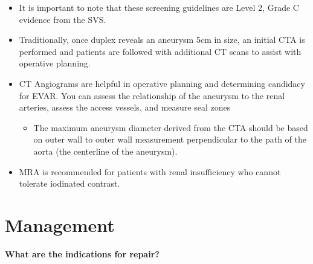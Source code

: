 \documentclass[
]{book}
\providecommand{\tightlist}{%
  \setlength{\itemsep}{0pt}\setlength{\parskip}{0pt}}
\begin{document}
\begin{itemize}
\item
  It is important to note that these screening guidelines are Level 2,
  Grade C evidence from the SVS.
\item
  Traditionally, once duplex reveals an aneurysm 5cm in size, an
  initial CTA is performed and patients are followed with additional
  CT scans to assist with operative planning.
\item
  CT Angiograms are helpful in operative planning and determining
  candidacy for EVAR. You can assess the relationship of the aneurysm
  to the renal arteries, assess the access vessels, and measure seal
  zones

  \begin{itemize}
  \tightlist
  \item
    The maximum aneurysm diameter derived from the CTA should be
    based on outer wall to outer wall measurement perpendicular to
    the path of the aorta (the centerline of the aneurysm).
  \end{itemize}
\item
  MRA is recommended for patients with renal insufficiency who cannot
  tolerate iodinated contrast.
\end{itemize}

\hypertarget{management-1}{%
\section{Management}\label{management-1}}

\textbf{What are the indications for repair?}
\citep{mooreVascularEndovascularSurgery2019}
\end{document}

